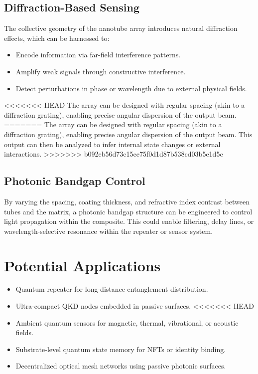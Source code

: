 \documentclass[11pt]{article}
\begin{document}
	\subsection{Diffraction-Based Sensing}
	The collective geometry of the nanotube array introduces natural diffraction effects, which can be harnessed to:
	\begin{itemize}
		\item Encode information via far-field interference patterns.
		\item Amplify weak signals through constructive interference.
		\item Detect perturbations in phase or wavelength due to external physical fields.
	\end{itemize}
<<<<<<< HEAD
	The array can be designed with regular spacing (akin to a diffraction grating), enabling precise angular dispersion of the output beam.
=======
	The array can be designed with regular spacing (akin to a diffraction grating), enabling precise angular dispersion of the output beam. This output can then be analyzed to infer internal state changes or external interactions.
>>>>>>> b092eb56d73c15ce75f0d1d87b538cd03b5e1d5c
	
	\subsection{Photonic Bandgap Control}
	By varying the spacing, coating thickness, and refractive index contrast between tubes and the matrix, a photonic bandgap structure can be engineered to control light propagation within the composite. This could enable filtering, delay lines, or wavelength-selective resonance within the repeater or sensor system.
	
	\section{Potential Applications}
	\begin{itemize}
		\item Quantum repeater for long-distance entanglement distribution.
		\item Ultra-compact QKD nodes embedded in passive surfaces.
<<<<<<< HEAD
		\item Ambient quantum sensors for magnetic, thermal, vibrational, or acoustic fields.
		\item Substrate-level quantum state memory for NFTs or identity binding.
		\item Decentralized optical mesh networks using passive photonic surfaces.
	\end{itemize}
	
\end{document}
